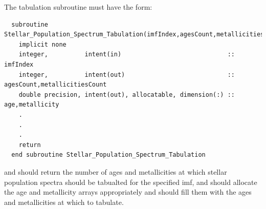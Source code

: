 The tabulation subroutine must have the form:
\begin{verbatim}
  subroutine Stellar_Population_Spectrum_Tabulation(imfIndex,agesCount,metallicitiesCount,age,metallicity)
    implicit none
    integer,          intent(in)                             :: imfIndex
    integer,          intent(out)                            :: agesCount,metallicitiesCount
    double precision, intent(out), allocatable, dimension(:) :: age,metallicity
    .
    .
    .
    return
  end subroutine Stellar_Population_Spectrum_Tabulation
\end{verbatim}
and should return the number of ages and metallicities at which stellar population spectra should be tabualted for the specified \gls{imf}, and should allocate the {\normalfont \ttfamily age} and {\normalfont \ttfamily metallicity} arrays appropriately and should fill them with the ages and metallicities at which to tabulate.

